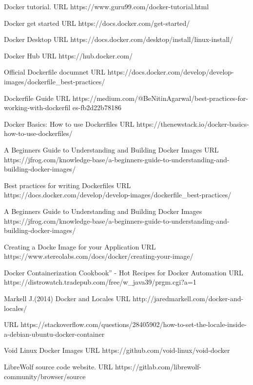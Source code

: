 \documentclass[a4paper]{article}  %
\begin{document}
\begin{thebibliography}{99}

Docker tutorial.
URL https://www.guru99.com/docker-tutorial.html

Docker get started
URL https://docs.docker.com/get-started/

Docker Desktop
URL https://docs.docker.com/desktop/install/linux-install/

Docker Hub
URL https://hub.docker.com/

Official Dockerfile documnet
URL https://docs.docker.com/develop/develop-images/dockerfile\_best-practices/


Dockerfile Guide
URL https://medium.com/@BeNitinAgarwal/best-practices-for-working-with-dockerfil
es-fb2d22b78186

Docker Basics: How to use Dockerfiles
URL https://thenewstack.io/docker-basics-how-to-use-dockerfiles/

A Beginners Guide to Understanding and Building Docker Images
URL https://jfrog.com/knowledge-base/a-beginners-guide-to-understanding-and-building-docker-images/

Best practices for writing Dockerfiles
URL https://docs.docker.com/develop/develop-images/dockerfile\_best-practices/

A Beginners Guide to Understanding and Building Docker Images
https://jfrog.com/knowledge-base/a-beginners-guide-to-understanding-and-
building-docker-images/

Creating a Docke Image for your Application
URL https://www.stereolabs.com/docs/docker/creating-your-image/

Docker Containerization Cookbook” - Hot Recipes for Docker Automation
URL https://distrowatch.tradepub.com/free/w\_java39/prgm.cgi?a=1

Markell J.(2014) Docker and Locales
URL http://jaredmarkell.com/docker-and-locales/


URL https://stackoverflow.com/questions/28405902/how-to-set-the-locale-inside-a-debian-ubuntu-docker-container

Void Linux Docker Images
URL https://github.com/void-linux/void-docker


LibreWolf source code website.
URL https://gitlab.com/librewolf-community/browser/source


\end{thebibliography}
\end{document}
